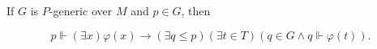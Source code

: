 If $G$ is $P$-generic over $M$ and $p \in G$, then

$$
p \Vdash (\exists x)\varphi(x) \to (\exists q \leq p)(\exists t \in T)(q \in G \land q \Vdash \varphi(t)).
$$
